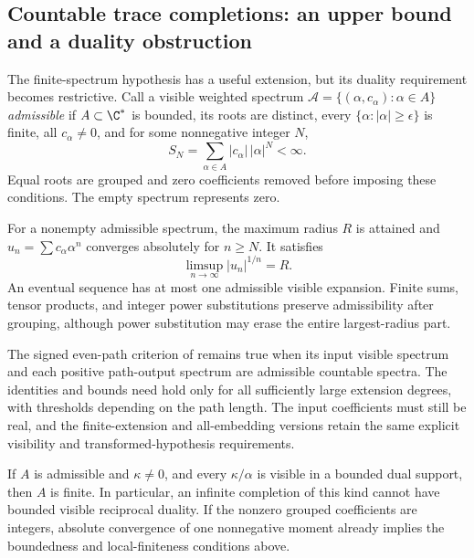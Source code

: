\subsection{Countable trace completions: an upper bound and a duality obstruction}
The finite-spectrum hypothesis has a useful extension, but its duality
requirement becomes restrictive. Call a visible weighted spectrum
$\mathcal A=\{(\alpha,c_\alpha):\alpha\in A\}$ \emph{admissible} if
$A\subset\C^*$ is bounded, its roots are distinct, every
$\{\alpha:|\alpha|\ge\epsilon\}$ is finite, all $c_\alpha\ne0$, and
for some nonnegative integer $N$,
\[
 S_N=\sum_{\alpha\in A}|c_\alpha|\,|\alpha|^N<\infty.
\]
Equal roots are grouped and zero coefficients removed before imposing
these conditions. The empty spectrum represents zero.

\begin{finding}\label{f:countable}
For a nonempty admissible spectrum, the maximum radius $R$ is attained
and $u_n=\sum c_\alpha\alpha^n$ converges absolutely for $n\ge N$.
It satisfies
\[
 \limsup_{n\to\infty}|u_n|^{1/n}=R.
\]
An eventual sequence has at most one admissible visible expansion.
Finite sums, tensor products, and integer power substitutions preserve
admissibility after grouping, although power substitution may erase the
entire largest-radius part.

The signed even-path criterion of  remains true when its
input visible spectrum and each positive path-output spectrum are
admissible countable spectra. The identities and bounds need hold only
for all sufficiently large extension degrees, with thresholds depending
on the path length. The input coefficients must still be real, and the
finite-extension and all-embedding versions retain the same explicit
visibility and transformed-hypothesis requirements.

If $A$ is admissible and $\kappa\ne0$, and every $\kappa/\alpha$ is
visible in a bounded dual support, then $A$ is finite. In particular,
an infinite completion of this kind cannot have bounded visible
reciprocal duality. If the nonzero grouped coefficients are integers,
absolute convergence of one nonnegative moment already implies the
boundedness and local-finiteness conditions above.
\end{finding}
